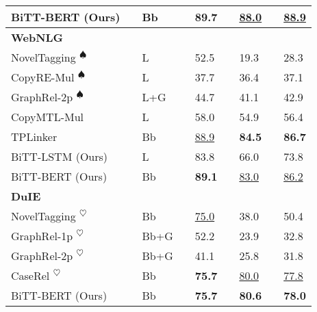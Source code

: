 \documentclass[conference]{IEEEtran}
\begin{document}
\begin{table}[t]
{\begin{tabular}{@{}lllllllll@{}}
    BiTT-BERT (Ours) &  & Bb      &  & \textbf{89.7} &  & \underline{88.0}    &  & \underline{88.9}    \\ \midrule
    \textbf{WebNLG}  &  &         &  &               &  &               &  &               \\
    NovelTagging \cite{Zheng2017Joint} \textsuperscript{$\spadesuit$}     &  & L       &  & 52.5          &  & 19.3          &  & 28.3          \\
    CopyRE-Mul \cite{Zeng2018Extracting} \textsuperscript{$\spadesuit$}       &  & L       &  & 37.7          &  & 36.4          &  & 37.1          \\
    GraphRel-2p \cite{Fu2019Graphrel} \textsuperscript{$\spadesuit$}      &  & L+G     &  & 44.7          &  & 41.1          &  & 42.9          \\
    CopyMTL-Mul \cite{Zeng2020copymtl}      &  & L       &  & 58.0          &  & 54.9          &  & 56.4          \\
    TPLinker \cite{Wang2020TPLinker}         &  & Bb      &  & \underline{88.9}    &  & \textbf{84.5} &  & \textbf{86.7} \\ \midrule
    BiTT-LSTM (Ours)       &  & L       &  & 83.8          &  & 66.0          &  & 73.8          \\
    BiTT-BERT (Ours) &  & Bb      &  & \textbf{89.1} &  & \underline{83.0}    &  & \underline{86.2}    \\ \midrule
    \textbf{DuIE}    &  &         &  &               &  &               &  &               \\
    NovelTagging \cite{Zheng2017Joint} \textsuperscript{$\heartsuit$}     &  & Bb      &  & \underline{75.0}    &  & 38.0          &  & 50.4          \\
    GraphRel-1p \cite{Fu2019Graphrel} \textsuperscript{$\heartsuit$}      &  & Bb+G    &  & 52.2          &  & 23.9          &  & 32.8          \\
    GraphRel-2p \cite{Fu2019Graphrel} \textsuperscript{$\heartsuit$}      &  & Bb+G    &  & 41.1          &  & 25.8          &  & 31.8          \\
    CaseRel \cite{Wei2020CasRel} \textsuperscript{$\heartsuit$}          &  & Bb      &  & \textbf{75.7} &  & \underline{80.0}    &  & \underline{77.8}    \\ \midrule
    BiTT-BERT (Ours) &  & Bb      &  & \textbf{75.7} &  & \textbf{80.6} &  & \textbf{78.0} \\ \bottomrule
    \end{tabular}}
\end{table}
\end{document}
